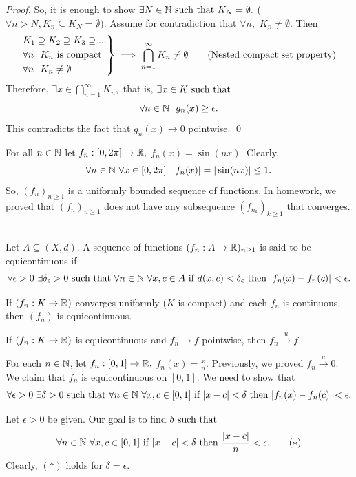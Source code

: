 \begin{proof}
    So, it is enough to show $\exists N \in \mathbb{N} \text{ such that } K_N = \emptyset.$ ($\forall n > N, K_n \subseteq K_N = \emptyset)$. Assume for contradiction that $\forall n,$ $K_n \neq \emptyset.$ Then
    \[
        \begin{rcases}
            K_1 \supseteq K_2 \supseteq K_3 \supseteq ... \\
            \forall n ~~K_n \text{ is compact} \\
            \forall n ~~K_n \neq \emptyset
        \end{rcases} \implies \bigcap_{n=1}^\infty K_n \neq \emptyset \tag{Nested compact set property}
    \]
    Therefore, $\exists x \in \bigcap \limits_{n=1}^\infty K_n,$ that is, $\exists x \in K \text{ such that }$
    $$\forall n \in \mathbb{N} ~~g_n(x) \geq \epsilon.$$
    This contradicts the fact that $g_n(x) \to 0$ pointwise.
    \qed
\end{proof}

\begin{example}
    For all $n \in \mathbb{N}$ let $f_n:[0,2\pi]\to \mathbb{R},$ $f_n(x) = \sin (nx)$. Clearly,
    \[\forall n \in \mathbb{N} ~\forall x \in [0, 2\pi] ~~|f_n(x)| = |\sin (nx)| \leq 1.\]
    So, $(f_n)_{n \geq 1}$ is a uniformly bounded sequence of functions. In homework, we proved that $(f_n)_{n \geq 1}$ does not have any subsequence $(f_{n_k})_{k \geq 1}$ that converges.
\end{example}

\begin{definition} \leavevmode \\
    Let $A \subseteq (X, d)$. A sequence of functions $(f_n : A \to \mathbb{R})_{n \geq 1}$ is said to be equicontinuous if
    $$\forall \epsilon > 0 ~ \exists \delta_\epsilon > 0 \text{ such that } \forall n \in \mathbb{N} ~\forall x, c \in A \text{ if } d(x,c) < \delta_\epsilon \text{ then } |f_n(x) - f_n(c)| < \epsilon.$$
\end{definition}

\begin{fact}
    If $(f_n: K \to \mathbb{R})$ converges uniformly ($K$ is compact) and each $f_n$ is continuous, then $(f_n)$ is equicontinuous.
\end{fact}

\begin{fact}
    If $(f_n:K \to \mathbb{R})$ is equicontinuous and $f_n \to f$ pointwise, then $f_n \overset{u}{\to} f.$
\end{fact}

\begin{example}
    For each $n \in \mathbb{N}$, let $f_n:[0,1] \to \mathbb{R},$ $f_n(x) = \frac{x}{n}.$ Previously, we proved $f_n \overset{u}{\to} 0.$ We claim that $f_n$ is equicontinuous on $[0,1]$. We need to show that 
    $$\forall \epsilon > 0 ~\exists \delta > 0 \text{ such that } \forall n \in \mathbb{N} ~\forall x, c \in [0,1] \text{ if $|x-c| < \delta$ then $|f_n(x) - f_n(c)| < \epsilon$.}$$

    Let $\epsilon > 0$ be given. Our goal is to find $\delta \text{ such that }$
    \[\forall n \in \mathbb{N} ~\forall x, c \in [0,1] \text{ if $|x-c| < \delta$ then $\dfrac{|x-c|}{n} < \epsilon$}. \tag{$*$}\]
    Clearly, $(*)$ holds for $\delta = \epsilon.$
\end{example}

